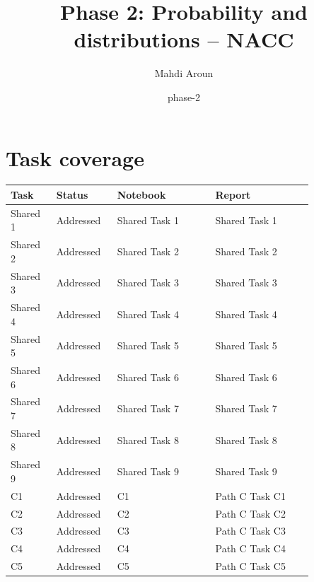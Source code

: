 \documentclass[11pt]{article}
\title{Phase 2: Probability and distributions -- NACC}
\author{Mahdi Aroun}
\date{phase-2}
\begin{document}
\maketitle

\section*{Task coverage}

\begin{tabular}{p{0.13\linewidth}p{0.14\linewidth}p{0.29\linewidth}p{0.29\linewidth}}

\textbf{Task} & \textbf{Status} & \textbf{Notebook} & \textbf{Report} \\

\hline

Shared 1 & Addressed & Shared Task 1 & Shared Task 1 \\

Shared 2 & Addressed & Shared Task 2 & Shared Task 2 \\

Shared 3 & Addressed & Shared Task 3 & Shared Task 3 \\

Shared 4 & Addressed & Shared Task 4 & Shared Task 4 \\

Shared 5 & Addressed & Shared Task 5 & Shared Task 5 \\

Shared 6 & Addressed & Shared Task 6 & Shared Task 6 \\

Shared 7 & Addressed & Shared Task 7 & Shared Task 7 \\

Shared 8 & Addressed & Shared Task 8 & Shared Task 8 \\

Shared 9 & Addressed & Shared Task 9 & Shared Task 9 \\

C1 & Addressed & C1 & Path C Task C1 \\

C2 & Addressed & C2 & Path C Task C2 \\

C3 & Addressed & C3 & Path C Task C3 \\

C4 & Addressed & C4 & Path C Task C4 \\

C5 & Addressed & C5 & Path C Task C5 \\

\end{tabular}
\end{document}
